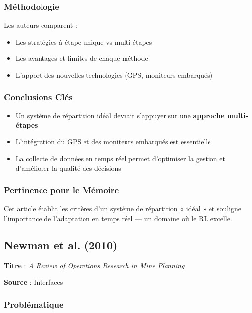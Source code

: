 \documentclass[12pt,a4paper]{article}
\begin{document}
\subsubsection{Méthodologie}

Les auteurs comparent :
\begin{itemize}
    \item Les stratégies à étape unique vs multi-étapes
    \item Les avantages et limites de chaque méthode
    \item L'apport des nouvelles technologies (GPS, moniteurs embarqués)
\end{itemize}

\subsubsection{Conclusions Clés}

\begin{itemize}
    \item Un système de répartition idéal devrait s'appuyer sur une \textbf{approche multi-étapes}
    \item L'intégration du GPS et des moniteurs embarqués est essentielle
    \item La collecte de données en temps réel permet d'optimiser la gestion et d'améliorer la qualité des décisions
\end{itemize}

\subsubsection{Pertinence pour le Mémoire}

Cet article établit les critères d'un système de répartition « idéal » et souligne l'importance de l'adaptation en temps réel --- un domaine où le RL excelle.

\subsection{Newman et al. (2010)}

\textbf{Titre} : \textit{A Review of Operations Research in Mine Planning}

\textbf{Source} : Interfaces

\subsubsection{Problématique}
\end{document}
